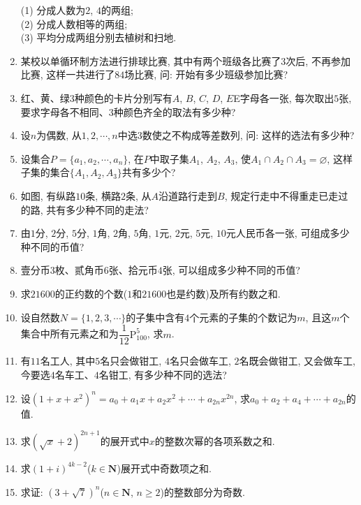 \documentclass[10pt,a4paper]{article}
\begin{document}
\begin{enumerate}[1.]
(1) 分成人数为$2$, $4$的两组;\\
(2) 分成人数相等的两组;\\
(3) 平均分成两组分别去植树和扫地.
\item 某校以单循环制方法进行排球比赛, 其中有两个班级各比赛了$3$次后, 不再参加比赛, 这样一共进行了$84$场比赛, 问: 开始有多少班级参加比赛?
\item 红、黄、绿$3$种颜色的卡片分别写有$A$, $B$, $C$, $D$, $E$E字母各一张, 每次取出$5$张, 要求字母各不相同、$3$种颜色齐全的取法有多少种?
\item 设$n$为偶数, 从$1, 2, \cdots, n$中选$3$数使之不构成等差数列, 问: 这样的选法有多少种?
\item 设集合$P=\{a_1,a_2,\cdots ,a_n\}$, 在$P$中取子集$A_1$, $A_2$, $A_3$, 使$A_1\cap A_2\cap A_3=\varnothing$, 这样子集的集合$\{A_1,A_2,A_3\}$共有多少个?
\item 如图, 有纵路$10$条, 横路$2$条, 从$A$沿道路行走到$B$, 规定行走中不得重走已走过的路, 共有多少种不同的走法?
\begin{center}
\end{center}
\item 由$1$分, $2$分, $5$分, $1$角, $2$角, $5$角, $1$元, $2$元, $5$元, $10$元人民币各一张, 可组成多少种不同的币值?
\item 壹分币$3$枚、贰角币$6$张、拾元币$4$张, 可以组成多少种不同的币值?
\item 求$21600$的正约数的个数($1$和$21600$也是约数)及所有约数之和.
\item 设自然数$N=\{1,2,3,\cdots\}$的子集中含有$4$个元素的子集的个数记为$m$, 且这$m$个集合中所有元素之和为$\dfrac 1{12}\mathrm{P}_{100}^5$, 求$m$.
\item 有$11$名工人, 其中$5$名只会做钳工, $4$名只会做车工, $2$名既会做钳工, 又会做车工, 今要选$4$名车工、$4$名钳工, 有多少种不同的选法?
\item 设$(1+x+x^2)^n=a_0+a_1x+a_2x^2+\cdots +a_{2n}x^{2n}$, 求$a_0+a_2+a_4+\cdots +a_{2n}$的值.
\item 求$(\sqrt x+2)^{2n+1}$的展开式中$x$的整数次幂的各项系数之和.
\item 求$(1+i)^{4k-2}$($k\in \mathbf{N}$)展开式中奇数项之和.
\item 求证: $(3+\sqrt 7)^n$($n\in \mathbf{N}$, $n\ge 2$)的整数部分为奇数.


\end{enumerate}
\end{document}
